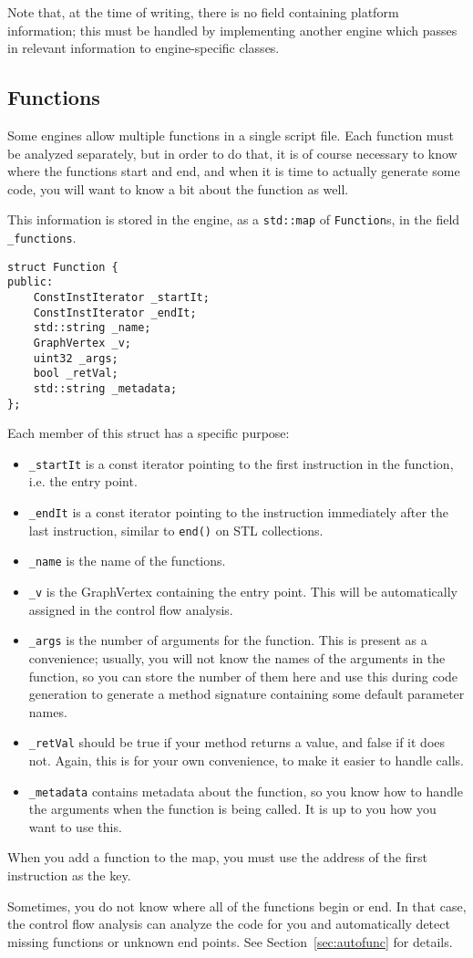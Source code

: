 Note that, at the time of writing, there is no field containing platform information; this must be handled by implementing another engine which passes in relevant information to engine-specific classes.

\subsection{Functions}
Some engines allow multiple functions in a single script file. Each function must be analyzed separately, but in order to do that, it is of course necessary to know where the functions start and end, and when it is time to actually generate some code, you will want to know a bit about the function as well.

This information is stored in the engine, as a \verb+std::map+ of \verb+Function+s, in the field \verb+ _functions+.

\begin{C++}
\begin{lstlisting}
struct Function {
public:
	ConstInstIterator _startIt;
	ConstInstIterator _endIt;
	std::string _name;
	GraphVertex _v;
	uint32 _args;
	bool _retVal;
	std::string _metadata;
};
\end{lstlisting}
\end{C++}

Each member of this struct has a specific purpose:
\begin{itemize}
\item \verb+_startIt+ is a const iterator pointing to the first instruction in the function, i.e. the entry point.
\item \verb+_endIt+ is a const iterator pointing to the instruction immediately after the last instruction, similar to \verb+end()+ on STL collections.
\item \verb+_name+ is the name of the functions.
\item \verb+_v+ is the GraphVertex containing the entry point. This will be automatically assigned in the control flow analysis.
\item \verb+_args+ is the number of arguments for the function. This is present as a convenience; usually, you will not know the names of the arguments in the function, so you can store the number of them here and use this during code generation to generate a method signature containing some default parameter names.
\item \verb+_retVal+ should be true if your method returns a value, and false if it does not. Again, this is for your own convenience, to make it easier to handle calls.
\item \verb+_metadata+ contains metadata about the function, so you know how to handle the arguments when the function is being called. It is up to you how you want to use this.
\end{itemize}

When you add a function to the map, you must use the address of the first instruction as the key.

Sometimes, you do not know where all of the functions begin or end. In that case, the control flow analysis can analyze the code for you and automatically detect missing functions or unknown end points. See Section~\vref{sec:autofunc} for details.
